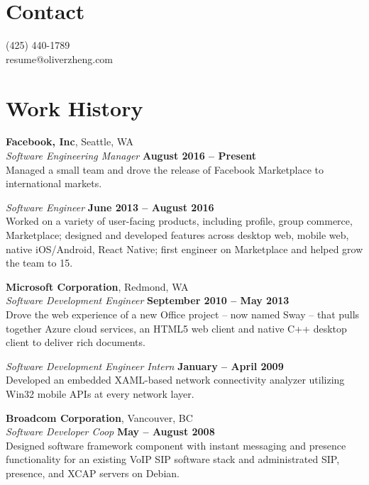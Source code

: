 \documentclass[margin,line]{resume}
\begin{document}
\begin{resume}

	\section{\mysidestyle Contact}
	(425) 440-1789
		\vspace{1mm}\\
	resume@oliverzheng.com

	\section{\mysidestyle Work History}

	\textbf{Facebook, Inc}, Seattle, WA \vspace{2mm}\\\vspace{1mm}%
	\textsl{Software Engineering Manager} \hfill
	\textbf{August 2016 -- Present}\\
	Managed a small team and drove the release of Facebook Marketplace to
	international markets.

	\textsl{Software Engineer} \hfill
	\textbf{June 2013 -- August 2016}\\
	Worked on a variety of user-facing products, including profile, group
	commerce, Marketplace; designed and developed features across desktop web,
	mobile web, native iOS/Android, React Native; first engineer on Marketplace
	and helped grow the team to 15.

	\textbf{Microsoft Corporation}, Redmond, WA \vspace{2mm}\\\vspace{1mm}%
	\textsl{Software Development Engineer} \hfill
	\textbf{September 2010 -- May 2013}\\
	Drove the web experience of a new Office project -- now named Sway -- that
	pulls together Azure cloud services, an HTML5 web client and native C++
	desktop client to deliver rich documents.

	\textsl{Software Development Engineer Intern} \hfill
	\textbf{January -- April 2009}\\
	Developed an embedded XAML-based network connectivity analyzer utilizing
	Win32 mobile APIs at every network layer.

	\textbf{Broadcom Corporation}, Vancouver, BC \vspace{2mm}\\\vspace{1mm}%
	\textsl{Software Developer Coop} \hfill
	\textbf{May -- August 2008}\\
	Designed software framework component with instant messaging and presence
	functionality for an existing VoIP SIP software stack and administrated SIP,
	presence, and XCAP servers on Debian.


\end{resume}
\end{document}
